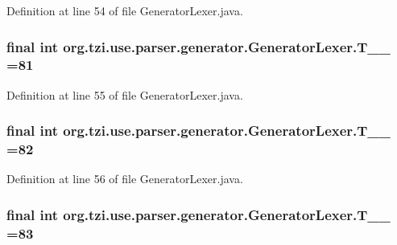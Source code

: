 Definition at line 54 of file Generator\-Lexer.\-java.

\hypertarget{classorg_1_1tzi_1_1use_1_1parser_1_1generator_1_1_generator_lexer_a7c0f96f5d0bd325683998c220805833a}{
\subsubsection[{T\-\_\-\-\_\-81}]{\setlength{\rightskip}{0pt plus 5cm}final int org.\-tzi.\-use.\-parser.\-generator.\-Generator\-Lexer.\-T\-\_\-\-\_ =81\hspace{0.3cm}{\ttfamily [static]}}}\label{classorg_1_1tzi_1_1use_1_1parser_1_1generator_1_1_generator_lexer_a7c0f96f5d0bd325683998c220805833a}


Definition at line 55 of file Generator\-Lexer.\-java.

\hypertarget{classorg_1_1tzi_1_1use_1_1parser_1_1generator_1_1_generator_lexer_a66a7128cdd93745c102458fd2d84bc0d}{
\subsubsection[{T\-\_\-\-\_\-82}]{\setlength{\rightskip}{0pt plus 5cm}final int org.\-tzi.\-use.\-parser.\-generator.\-Generator\-Lexer.\-T\-\_\-\-\_ =82\hspace{0.3cm}{\ttfamily [static]}}}\label{classorg_1_1tzi_1_1use_1_1parser_1_1generator_1_1_generator_lexer_a66a7128cdd93745c102458fd2d84bc0d}


Definition at line 56 of file Generator\-Lexer.\-java.

\hypertarget{classorg_1_1tzi_1_1use_1_1parser_1_1generator_1_1_generator_lexer_abc14513c8aa806531630ee54b4528943}{
\subsubsection[{T\-\_\-\-\_\-83}]{\setlength{\rightskip}{0pt plus 5cm}final int org.\-tzi.\-use.\-parser.\-generator.\-Generator\-Lexer.\-T\-\_\-\-\_ =83\hspace{0.3cm}{\ttfamily [static]}}}\label{classorg_1_1tzi_1_1use_1_1parser_1_1generator_1_1_generator_lexer_abc14513c8aa806531630ee54b4528943}


